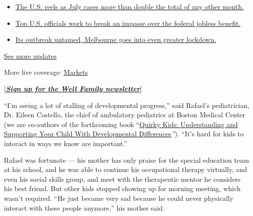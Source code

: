 \begin{itemize}
\tightlist
\item
  \href{https://www.nytimes3xbfgragh.onion/2020/08/01/world/coronavirus-covid-19.html?action=click\&pgtype=Article\&state=default\&region=MAIN_CONTENT_1\&context=storylines_live_updates\#link-34047410}{The
  U.S. reels as July cases more than double the total of any other
  month.}
\item
  \href{https://www.nytimes3xbfgragh.onion/2020/08/01/world/coronavirus-covid-19.html?action=click\&pgtype=Article\&state=default\&region=MAIN_CONTENT_1\&context=storylines_live_updates\#link-780ec966}{Top
  U.S. officials work to break an impasse over the federal jobless
  benefit.}
\item
  \href{https://www.nytimes3xbfgragh.onion/2020/08/01/world/coronavirus-covid-19.html?action=click\&pgtype=Article\&state=default\&region=MAIN_CONTENT_1\&context=storylines_live_updates\#link-2bc8948}{Its
  outbreak untamed, Melbourne goes into even greater lockdown.}
\end{itemize}

\href{https://www.nytimes3xbfgragh.onion/2020/08/01/world/coronavirus-covid-19.html?action=click\&pgtype=Article\&state=default\&region=MAIN_CONTENT_1\&context=storylines_live_updates}{See
more updates}

More live coverage:
\href{https://www.nytimes3xbfgragh.onion/live/2020/07/31/business/stock-market-today-coronavirus?action=click\&pgtype=Article\&state=default\&region=MAIN_CONTENT_1\&context=storylines_live_updates}{Markets}

{[}\textbf{\href{https://www.nytimes3xbfgragh.onion/newsletters/well-family}{\emph{Sign
up for the Well Family newsletter}}}{]}

``I'm seeing a lot of stalling of developmental progress,'' said
Rafael's pediatrician, Dr. Eileen Costello, the chief of ambulatory
pediatrics at Boston Medical Center (we are co-authors of the
forthcoming book
``\href{https://shop.aap.org/quirky-kids-2nd-edition-paperback/}{Quirky
Kids: Understanding and Supporting Your Child With Developmental
Differences}\emph{''}). ``It's hard for kids to interact in ways we know
are important.''

Rafael was fortunate --- his mother has only praise for the special
education team at his school, and he was able to continue his
occupational therapy virtually, and even his social skills group, and
meet with the therapeutic mentor he considers his best friend. But other
kids stopped showing up for morning meeting, which wasn't required. ``He
just became very sad because he could never physically interact with
these people anymore,'' his mother said.

